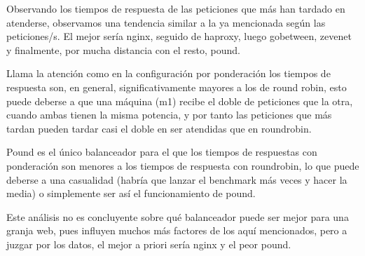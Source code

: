 Observando los tiempos de respuesta de las peticiones que más han tardado en atenderse, observamos una tendencia similar a la ya mencionada según las peticiones/s. El mejor sería nginx, seguido de haproxy, luego gobetween, zevenet y finalmente, por mucha distancia con el resto, pound.

Llama la atención como en la configuración por ponderación los tiempos de respuesta son, en general, significativamente mayores a los de round robin, esto puede deberse a que una máquina (m1) recibe el doble de peticiones que la otra, cuando ambas tienen la misma potencia, y por tanto las peticiones que más tardan pueden tardar casi el doble en ser atendidas que en roundrobin.

Pound es el único balanceador para el que los tiempos de respuestas con ponderación son menores a los tiempos de respuesta con roundrobin, lo que puede deberse a una casualidad (habría que lanzar el benchmark más veces y hacer la media) o simplemente ser así el funcionamiento de pound.

Este análisis no es concluyente sobre qué balanceador puede ser mejor para una granja web, pues influyen muchos más factores de los aquí mencionados, pero a juzgar por los datos, el mejor a priori sería nginx y el peor pound.



